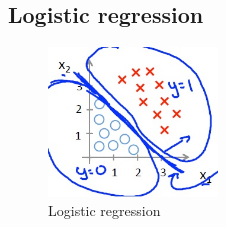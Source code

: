 \documentclass[12pt,a4paper]{article}
\begin{document}
\newpage
\subsection{Logistic regression}
\begin{figure}[htb]
\center
\includegraphics[width=0.4\textwidth]{logistic_regresion}
\caption{Logistic regression}
\end{figure}
\end{document}

